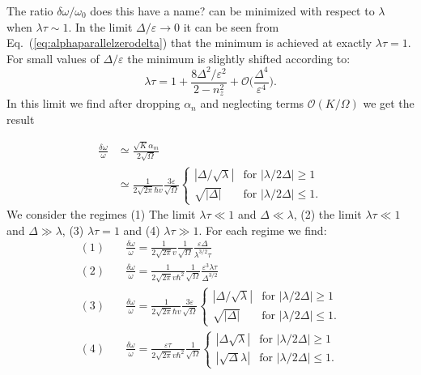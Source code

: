 The ratio $\delta\omega/\omega_0$ {\color{blue} does this have a name?} can be minimized with respect to $\lambda$ when $\lambda\tau\sim1$. In the limit $\Delta/\varepsilon\rightarrow0$ it can be seen from Eq.~(\ref{eq:alphaparallelzerodelta}) that the minimum is achieved at exactly $\lambda\tau=1$. For small values of $\Delta/\varepsilon$ the minimum is slightly shifted according to:
\begin{equation}
    \lambda\tau = 1 + \frac{8\Delta^2/\varepsilon^2}{2-n_z^2}+\mathcal{O}\Big(\frac{\Delta^4}{\varepsilon^4}\Big).
\end{equation}
In this limit we find after dropping $\alpha_n$ and neglecting terms $\mathcal{O}(K/\Omega)$ we get the result

\begin{align}
    \frac{\delta\omega}{\omega}  & \simeq \frac{\sqrt{K}\alpha_m}{2\sqrt{\Omega}}\nonumber\\
     & \simeq\frac{1}{2\sqrt{2\pi}\hbar v}\frac{3\varepsilon}{\sqrt{\Omega}} \begin{cases}
    |\Delta/\sqrt{\lambda}|  &  \text{for } |\lambda/2\Delta| \geq 1 \\
    \sqrt{|\Delta|}  &  \text{for } |\lambda/2\Delta| \leq 1.
    \end{cases}
    \label{eq:freq}
\end{align}
We consider the regimes (1) The limit $\lambda\tau\ll1$ and $\Delta\ll\lambda$, (2) the limit $\lambda\tau\ll1$ and $\Delta\gg\lambda$, (3) $\lambda\tau=1$ and (4) $\lambda\tau\gg1$. For each regime we find:
\begin{align}
    (1) & \quad \frac{\delta\omega}{\omega}= \frac{1}{2\sqrt{2\pi} v}\frac{1}{\sqrt{\Omega}}\frac{\varepsilon\Delta}{\lambda^{3/2}\tau}\\
    (2) & \quad \frac{\delta\omega}{\omega}= \frac{1}{2\sqrt{2\pi} v\hbar^2}\frac{1}{\sqrt{\Omega}}\frac{\varepsilon^3\lambda\tau}{\Delta^{3/2}}\\
    (3) & \quad \frac{\delta\omega}{\omega}= \frac{1}{2\sqrt{2\pi}\hbar v}\frac{3\varepsilon}{\sqrt{\Omega}} \begin{cases}
    |\Delta/\sqrt{\lambda}|  &  \text{for } |\lambda/2\Delta| \geq 1 \\
    \sqrt{|\Delta|}  &  \text{for } |\lambda/2\Delta| \leq 1.
    \end{cases}\\
    (4) & \quad \frac{\delta\omega}{\omega}= \frac{\varepsilon\tau}{2\sqrt{2\pi} v\hbar^2}\frac{1}{\sqrt{\Omega}}
    \begin{cases}
    |\Delta\sqrt{\lambda}|  &  \text{for } |\lambda/2\Delta| \geq 1 \\
    |\sqrt{\Delta}\lambda|  &  \text{for } |\lambda/2\Delta| \leq 1.
    \end{cases} 
\end{align}
